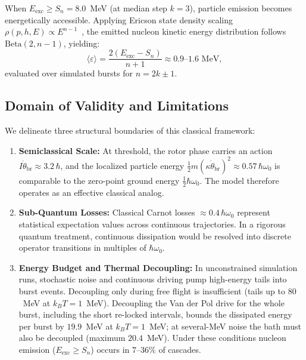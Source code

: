 \documentclass[aps,prc,twocolumn,superscriptaddress,amsmath,amssymb,nofootinbib]{revtex4-2}
\begin{document}
When \(E_{\text{exc}} \ge S_n = 8.0\)~MeV (at median step \(k = 3\)), particle emission becomes energetically accessible. Applying Ericson state density scaling \(\rho(p,h,E) \propto E^{n-1}\)~\cite{Ericson1960}, the emitted nucleon kinetic energy distribution follows \(\text{Beta}(2, n-1)\), yielding:
\begin{equation}
\langle \varepsilon \rangle = \frac{2 (E_{\text{exc}} - S_n)}{n + 1} \approx 0.9\text{--}1.6\text{ MeV},
\end{equation}
evaluated over simulated bursts for \(n = 2k \pm 1\).

\subsection{Domain of Validity and Limitations}
We delineate three structural boundaries of this classical framework:
\begin{enumerate}
    \item \textbf{Semiclassical Scale:} At threshold, the rotor phase carries an action \(I \dot{\theta}_{\text{br}} \approx 3.2\,\hbar\), and the localized particle energy \(\frac{1}{2}m(\kappa\dot{\theta}_{\text{br}})^2 \approx 0.57\,\hbar\omega_0\) is comparable to the zero-point ground energy \(\frac{1}{2}\hbar\omega_0\). The model therefore operates as an effective classical analog.
    \item \textbf{Sub-Quantum Losses:} Classical Carnot losses \(\approx 0.4\,\hbar\omega_0\) represent statistical expectation values across continuous trajectories. In a rigorous quantum treatment, continuous dissipation would be resolved into discrete operator transitions in multiples of \(\hbar\omega_0\).
    \item \textbf{Energy Budget and Thermal Decoupling:} In unconstrained simulation runs, stochastic noise and continuous driving pump high-energy tails into burst events. Decoupling only during free flight is insufficient (tails up to \(80\)~MeV at \(k_BT = 1\)~MeV). Decoupling the Van der Pol drive for the whole burst, including the short re-locked intervals, bounds the dissipated energy per burst by \(19.9\)~MeV at \(k_BT = 1\)~MeV; at several-MeV noise the bath must also be decoupled (maximum \(20.4\)~MeV). Under these conditions nucleon emission (\(E_{\text{exc}} \ge S_n\)) occurs in \(7\text{--}36\%\) of cascades.
\end{enumerate}
\end{document}
